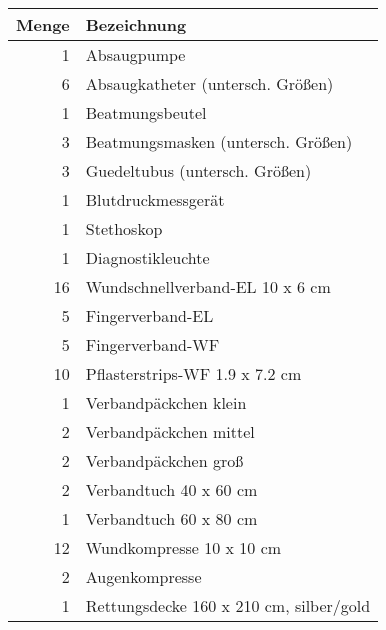 \begin{tabular}{r|l}
        \hline
        Menge & Bezeichnung                                                              \\ \hline
        1     & Absaugpumpe                                                              \\ 
        6     & Absaugkatheter (untersch. Größen)                                        \\ 
        1     & Beatmungsbeutel                                                          \\ 
        3     & Beatmungsmasken (untersch. Größen)                                       \\ 
        3     & Guedeltubus (untersch. Größen)                                           \\ 
        1     & Blutdruckmessgerät                                                       \\ 
        1     & Stethoskop                                                               \\ 
        1     & Diagnostikleuchte                                                        \\ 
        16    & Wundschnellverband-EL 10 x 6 cm					         \\ 
        5     & Fingerverband-EL                                                         \\ 
        5     & Fingerverband-WF                                                         \\ 
        10    & Pflasterstrips-WF 1.9 x 7.2 cm				         \\ 
        1     & Verbandpäckchen klein                                                    \\ 
        2     & Verbandpäckchen mittel                                                   \\ 
        2     & Verbandpäckchen groß                                                     \\ 
        2     & Verbandtuch 40 x 60 cm				                 \\ 
        1     & Verbandtuch 60 x 80 cm					                 \\ 
        12    & Wundkompresse 10 x 10 cm 				                 \\ 
        2     & Augenkompresse                                                           \\ 
        1     & Rettungsdecke 160 x 210 cm, silber/gold 				 \\ 

\end{tabular}
